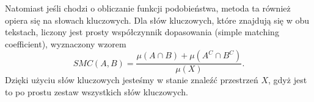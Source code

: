 \documentclass[a4paper]{classrep}
\begin{document}
Natomiast jeśli chodzi o obliczanie funkcji podobieństwa, metoda ta również opiera się na słowach kluczowych. Dla słów kluczowych, które znajdują się w obu tekstach, liczony jest prosty współczynnik dopasowania (simple matching coefficient), wyznaczony
wzorem
\[SMC(A,B) = \frac{\mu(A \cap B)+\mu(A^C \cap B^C)}{\mu(X)}.\]
Dzięki użyciu słów kluczowych jesteśmy w stanie znaleźć przestrzeń \(X\), gdyż jest to po prostu zestaw wszystkich słów kluczowych.
%
%
\end{document}
